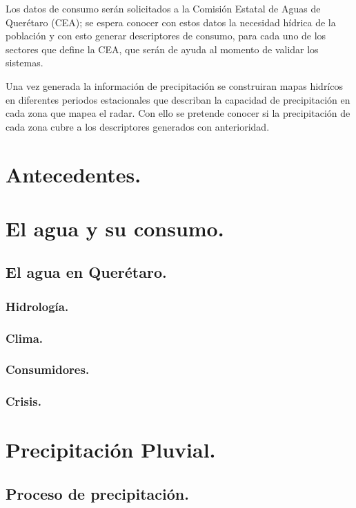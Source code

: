 \documentclass[letterpaper,12pt,oneside]{book}
\newcommand{\figura}[4]
{
  \begin{figure}[H]
    \centering
    \texttt{[image: \#2]}
    \caption{#3}
    \label{#4}
  \end{figure}
}
\begin{document}
    Los datos de consumo serán solicitados a la Comisión Estatal de Aguas de Querétaro (CEA); se espera conocer con estos datos la necesidad hídrica de la población y con esto generar descriptores de consumo, para cada uno de los sectores que define la CEA, que serán de ayuda al momento de validar los sistemas.

    Una vez generada la información de precipitación se construiran mapas hidrícos en diferentes periodos estacionales que describan la capacidad de precipitación en cada zona que mapea el radar. Con ello se pretende conocer si la precipitación de cada zona cubre a los descriptores generados con anterioridad.
\newpage
\tableofcontents

\mainmatter

\chapter{Antecedentes.} 
\chapter{El agua y su consumo.}
    \section{El agua en Querétaro.}
        \subsection{Hidrología.}
        \subsection{Clima.}
        \subsection{Consumidores.}
        \subsection{Crisis.}
\chapter{Precipitación Pluvial.} 
    \section{Proceso de precipitación.}
\end{document}

